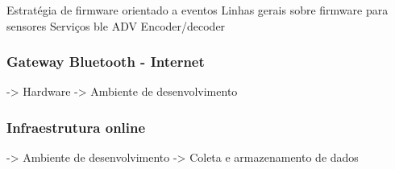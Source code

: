 
Estratégia de firmware orientado a eventos
Linhas gerais sobre firmware para sensores
Serviços ble
ADV Encoder/decoder


\subsubsection{Gateway Bluetooth - Internet}
			-> Hardware
			-> Ambiente de desenvolvimento

\subsubsection{Infraestrutura online}
-> Ambiente de desenvolvimento	
-> Coleta e armazenamento de dados
